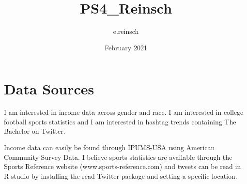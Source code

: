 \documentclass{article}
\title{PS4_Reinsch}
\author{e.reinsch }
\date{February 2021}
\begin{document}
\maketitle

\section{Data Sources}

I am interested in income data across gender and race. 
I am interested in college football sports statistics and I am interested in hashtag trends containing The Bachelor on Twitter.

Income data can easily be found through IPUMS-USA using American Community Survey Data. I believe sports statistics are available through the Sports Reference website (www.sports-reference.com) and tweets can be read in R studio by installing the read Twitter package and setting a specific location.
\end{document}

